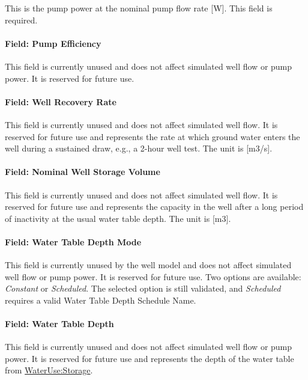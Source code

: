This is the pump power at the nominal pump flow rate {[}W{]}. This field is required.

\paragraph{Field: Pump Efficiency}\label{field-pump-efficiency}

This field is currently unused and does not affect simulated well flow or pump power. It is reserved for future use.

\paragraph{Field: Well Recovery Rate}\label{field-well-recovery-rate}

This field is currently unused and does not affect simulated well flow. It is reserved for future use and represents the rate at which ground water enters the well during a sustained draw, e.g., a 2-hour well test. The unit is {[}m3/s{]}.

\paragraph{Field: Nominal Well Storage Volume}\label{field-nominal-well-storage-volume}

This field is currently unused and does not affect simulated well flow. It is reserved for future use and represents the capacity in the well after a long period of inactivity at the usual water table depth. The unit is {[}m3{]}.

\paragraph{Field: Water Table Depth Mode}\label{field-water-table-depth-mode}

This field is currently unused by the well model and does not affect simulated well flow or pump power. It is reserved for future use. Two options are available: \emph{Constant} or \emph{Scheduled}. The selected option is still validated, and \emph{Scheduled} requires a valid Water Table Depth Schedule Name.

\paragraph{Field: Water Table Depth}\label{field-water-table-depth}

This field is currently unused and does not affect simulated well flow or pump power. It is reserved for future use and represents the depth of the water table from \hyperref[waterusestorage]{WaterUse:Storage}.

